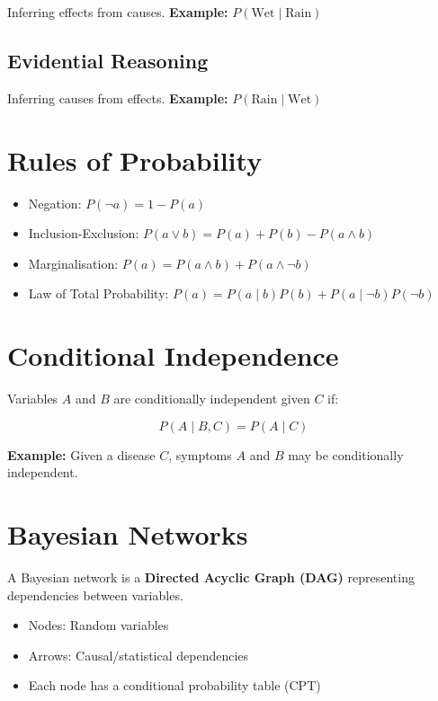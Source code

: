 Inferring effects from causes.  
\textbf{Example:} \( P(\text{Wet} \mid \text{Rain}) \)

\subsection*{Evidential Reasoning}

Inferring causes from effects.  
\textbf{Example:} \( P(\text{Rain} \mid \text{Wet}) \)

\section{Rules of Probability}

\begin{itemize}
    \item Negation: \( P(\neg a) = 1 - P(a) \)
    \item Inclusion-Exclusion: \( P(a \vee b) = P(a) + P(b) - P(a \wedge b) \)
    \item Marginalisation: \( P(a) = P(a \wedge b) + P(a \wedge \neg b) \)
    \item Law of Total Probability: \( P(a) = P(a \mid b)P(b) + P(a \mid \neg b)P(\neg b) \)
\end{itemize}

\section{Conditional Independence}

Variables \( A \) and \( B \) are conditionally independent given \( C \) if:

\[
P(A \mid B, C) = P(A \mid C)
\]

\textbf{Example:} Given a disease \( C \), symptoms \( A \) and \( B \) may be conditionally independent.

\section{Bayesian Networks}

A Bayesian network is a \textbf{Directed Acyclic Graph (DAG)} representing dependencies between variables.

\begin{itemize}
    \item Nodes: Random variables
    \item Arrows: Causal/statistical dependencies
    \item Each node has a conditional probability table (CPT)
\end{itemize}

